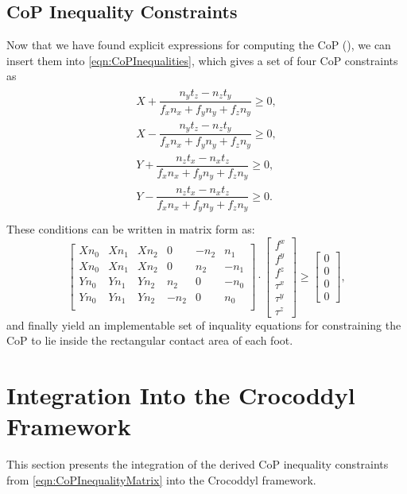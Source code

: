 \subsection{CoP Inequality Constraints}
Now that we have found explicit expressions for computing the \gls{CoP} (), we can insert them into \cref{eqn:CoPInequalities}, which gives a set of four \gls{CoP} constraints as 
\begin{align}\label{eqn:CoPInequalityEqs}
\begin{split}
X + \dfrac{n_yt_z - n_zt_y}{f_xn_x+f_yn_y+f_zn_y} \geq 0, \\
X - \dfrac{n_yt_z - n_zt_y}{f_xn_x+f_yn_y+f_zn_y} \geq 0, \\
Y + \dfrac{n_zt_x-n_xt_z}{f_xn_x+f_yn_y+f_zn_y} \geq 0, \\
Y - \dfrac{n_zt_x-n_xt_z}{f_xn_x+f_yn_y+f_zn_y} \geq 0. \\
\end{split}
\end{align}
These conditions can be written in matrix form as:  
\begin{equation}\label{eqn:CoPInequalityMatrix}
\begin{bmatrix}  
Xn_0 & Xn_1 & Xn_2 & 0 & -n_2 & n_1 \\
Xn_0 & Xn_1 & Xn_2 & 0 & n_2 & -n_1 \\
Yn_0 & Yn_1 & Yn_2 & n_2 & 0 & -n_0 \\
Yn_0 & Yn_1 & Yn_2 & -n_2 & 0 & n_0 \\ \end{bmatrix} \cdot
\begin{bmatrix} f^x \\ f^y \\ f^z \\ \tau^x \\ \tau^y \\ \tau^z \end{bmatrix} \geq
\begin{bmatrix} 0 \\ 0 \\ 0 \\ 0 \end{bmatrix},
\end{equation}
and finally yield an implementable set of inquality equations for constraining the \gls{CoP} to lie inside the rectangular contact area of each foot. 


\section{Integration Into the Crocoddyl Framework}\label{sec:StabilityIntegration}
This section presents the integration of the derived CoP inequality constraints from \cref{eqn:CoPInequalityMatrix} into the Crocoddyl framework. 


